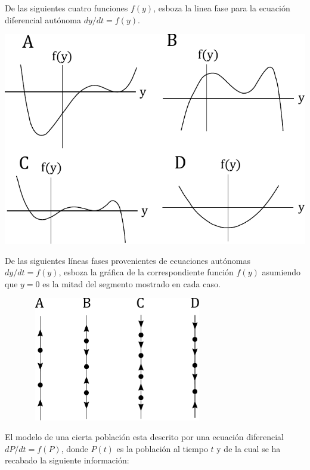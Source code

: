 \documentclass[12pt]{exam}
\begin{document}
\begin{questions}
     \question%
     De las siguientes cuatro funciones $f(y)$, esboza la linea fase para la ecuación diferencial autónoma $dy/dt=f(y)$.
     \begin{center}
     \includegraphics[scale=.8]{F2T1.pdf}
     \end{center}
     
     \question%
     De las siguientes líneas fases provenientes de ecuaciones autónomas $dy/dt=f(y)$, esboza la gráfica de la correspondiente función $f(y)$ asumiendo que $y=0$ es la mitad del segmento mostrado en cada caso.
     
     \begin{center}
     \includegraphics[width=10cm, height=5.4cm]{F3T1.pdf}    
     \end{center}
     
     \question%
     El modelo de una cierta población esta descrito por una ecuación diferencial $dP/dt=f(P)$, donde $P(t)$ es la población al tiempo $t$ y de la cual se ha recabado la siguiente información:
     

\end{questions}
\end{document}
